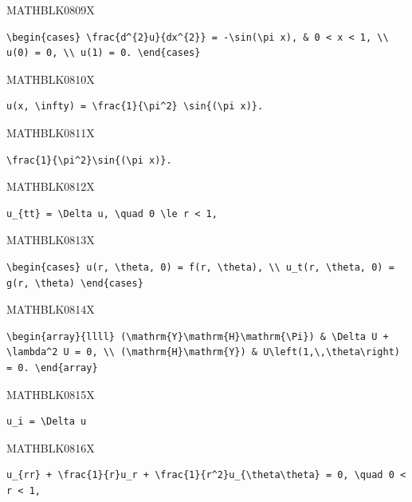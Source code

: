 \documentclass[
  ukrainian,
]{article}
\begin{document}
MATHBLK0809X

\begin{verbatim}
\begin{cases} \frac{d^{2}u}{dx^{2}} = -\sin(\pi x), & 0 < x < 1, \\ u(0) = 0, \\ u(1) = 0. \end{cases}
\end{verbatim}

MATHBLK0810X

\begin{verbatim}
u(x, \infty) = \frac{1}{\pi^2} \sin{(\pi x)}.
\end{verbatim}

MATHBLK0811X

\begin{verbatim}
\frac{1}{\pi^2}\sin{(\pi x)}.
\end{verbatim}

MATHBLK0812X

\begin{verbatim}
u_{tt} = \Delta u, \quad 0 \le r < 1,
\end{verbatim}

MATHBLK0813X

\begin{verbatim}
\begin{cases} u(r, \theta, 0) = f(r, \theta), \\ u_t(r, \theta, 0) = g(r, \theta) \end{cases}
\end{verbatim}

MATHBLK0814X

\begin{verbatim}
\begin{array}{llll} (\mathrm{Y}\mathrm{H}\mathrm{\Pi}) & \Delta U + \lambda^2 U = 0, \\ (\mathrm{H}\mathrm{Y}) & U\left(1,\,\theta\right) = 0. \end{array}
\end{verbatim}

MATHBLK0815X

\begin{verbatim}
u_i = \Delta u
\end{verbatim}

MATHBLK0816X

\begin{verbatim}
u_{rr} + \frac{1}{r}u_r + \frac{1}{r^2}u_{\theta\theta} = 0, \quad 0 < r < 1,
\end{verbatim}
\end{document}
